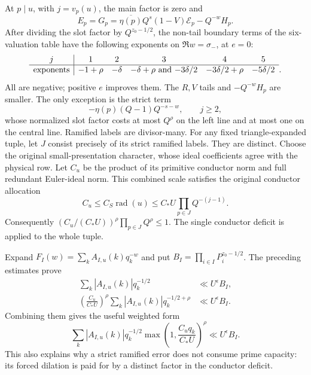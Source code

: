 At $p\mid u$, with $j=v_p(u)$, the main factor is zero and
\[
 E_p=G_p=\overline{\eta(p)}Q^s(1-V)\mathcal E_p-Q^{-w}H_p.
\]
After dividing the slot factor by $Q^{z_0-1/2}$, the non-tail boundary
terms of the six-valuation table have the following exponents on
$\Re w=\sigma_-$, at $e=0$:
\[
\begin{array}[b]{c|ccccc}
 j&1&2&3&4&5\\ \hline
 \text{exponents}&-1+\rho&-\delta&-\delta+\rho\ \text{and}\ {-3\delta/2}
   &-3\delta/2+\rho&-5\delta/2
\end{array}.
\]
All are negative; positive $e$ improves them.  The $R,V$ tails and
$-Q^{-w}H_p$ are smaller.  The only exception is the strict term
\[
 -\eta(p)(Q-1)Q^{-s-w},\qquad j\ge2,
\]
whose normalized slot factor costs at most $Q^\rho$ on the left line
and at most one on the central line.  Ramified labels are divisor-many.
For any fixed triangle-expanded tuple, let $J$ consist precisely of
its strict ramified labels.  They are distinct.  Choose the original
small-presentation character, whose ideal coefficients agree with the
physical row. Let $C_u$ be the product of its primitive conductor norm
and full redundant Euler-ideal norm. This combined scale satisfies
the original conductor allocation
\[
 C_u\le C_S\operatorname{rad}(u)
 \le C_*U\prod_{p\in J}Q^{-(j-1)}.
\]
Consequently
$(C_u/(C_*U))^\rho\prod_{p\in J}Q^\rho\le1$.
The single conductor deficit is applied to the whole tuple.

Expand $F_I(w)=\sum_k A_{I,u}(k)q_k^{-w}$ and put
$B_I=\prod_{i\in I}P_i^{z_0-1/2}$.  The preceding estimates prove
\begin{align}
 \sum_k|A_{I,u}(k)|q_k^{-1/2}&\ll U^\epsilon B_I,
 \label{eq:new-central-coefficient-norm}\\
 \left(\frac{C_u}{C_*U}\right)^\rho
 \sum_k|A_{I,u}(k)|q_k^{-1/2+\rho}&\ll U^\epsilon B_I.
 \label{eq:new-left-coefficient-norm}
\end{align}
Combining them gives the useful weighted form
\begin{equation}\label{eq:new-weighted-coefficient-norm}
 \sum_k|A_{I,u}(k)|q_k^{-1/2}
 \max\left(1,\frac{C_uq_k}{C_*U}\right)^\rho
 \ll U^\epsilon B_I.
\end{equation}
This also explains why a strict ramified error does not consume prime
capacity: its forced dilation is paid for by a distinct factor in the
conductor deficit.


